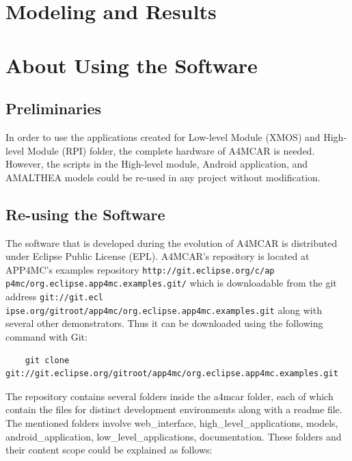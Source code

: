 \section{Modeling and Results}
\newpage
\section{About Using the Software}
\subsection{Preliminaries}
In order to use the applications created for Low-level Module (XMOS) and High-level Module (RPI) folder, the complete hardware of A4MCAR is needed. However, the scripts in the High-level module, Android application, and AMALTHEA models could be re-used in any project without modification.
\subsection{Re-using the Software}
The software that is developed during the evolution of A4MCAR is distributed under Eclipse Public License (EPL). A4MCAR's repository is located at APP4MC's examples repository \texttt{http://git.eclipse.org/c/ap p4mc/org.eclipse.app4mc.examples.git/} which is downloadable from the git address \texttt{git://git.ecl ipse.org/gitroot/app4mc/org.eclipse.app4mc.examples.git} along with several other demonstrators. Thus it can be downloaded using the following command with Git:
\begin{lstlisting}
	git clone git://git.eclipse.org/gitroot/app4mc/org.eclipse.app4mc.examples.git
\end{lstlisting}

The repository contains several folders inside the a4mcar folder, each of which contain the files for distinct development environments along with a readme file. The mentioned folders involve web{\_}interface, high{\_}level{\_}applications, models, android{\_}application, low{\_}level{\_}applications, documentation. These folders and their content scope could be explained as follows:

